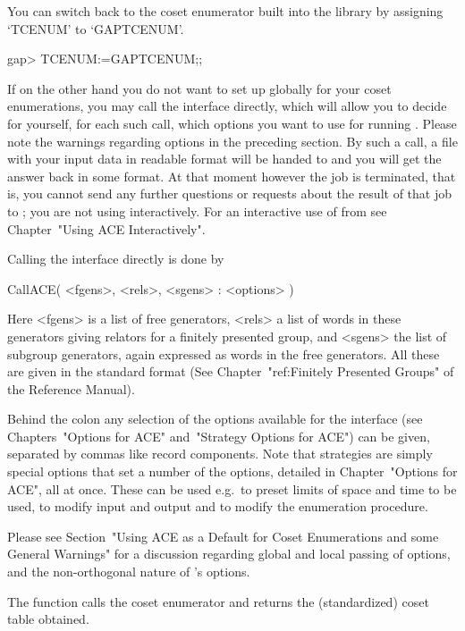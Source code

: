 You can switch back to the coset  enumerator  built  into  the  {\GAP}
library by assigning `TCENUM' to `GAPTCENUM'.

\begintt
gap> TCENUM:=GAPTCENUM;;
\endtt


If on the other hand you do not want to set  up  {\ACE}  globally  for
your coset enumerations, you may call the {\ACE}  interface  directly,
which will allow you to decide for yourself, for each such call, which
options you want to use for running {\ACE}. Please note  the  warnings
regarding options in the preceding section. By such  a  call,  a  file
with your input data in {\ACE}  readable  format  will  be  handed  to
{\ACE} and you will get the answer back in some {\GAP} format. At that
moment however the {\ACE} job is terminated, that is, you cannot  send
any further questions or requests about the  result  of  that  job  to
{\ACE}; you are not using {\ACE} interactively. For an interactive use
of {\ACE} from {\GAP} see Chapter~"Using ACE Interactively".

Calling the {\ACE} interface directly is done by

\>CallACE( <fgens>, <rels>, <sgens> : <options> )

Here <fgens> is  a list of free generators, <rels> a  list of words in
these generators  giving relators for a finitely  presented group, and
<sgens> the list  of subgroup generators, again expressed  as words in
the free generators. All these are given in the standard {\GAP} format
(See Chapter~"ref:Finitely  Presented Groups" of  the {\GAP} Reference
Manual).

Behind the colon any  selection  of  the  options  available  for  the
interface (see Chapters~"Options for ACE"  and~"Strategy  Options  for
ACE") can be given, separated by commas like record  components.  Note
that strategies are simply special options that set a  number  of  the
options, detailed in Chapter~"Options for ACE", all at once. These can
be used e.g.~to preset limits of space and time to be used, to  modify
input and output and to modify the enumeration procedure.

Please  see Section~"Using ACE as a Default for Coset Enumerations and 
some General Warnings" for a discussion  regarding  global  and  local
passing of options, and the non-orthogonal nature of {\ACE}'s options.

The  function   calls the  {\ACE}  coset  enumerator  and returns  the
(standardized) coset table obtained.

